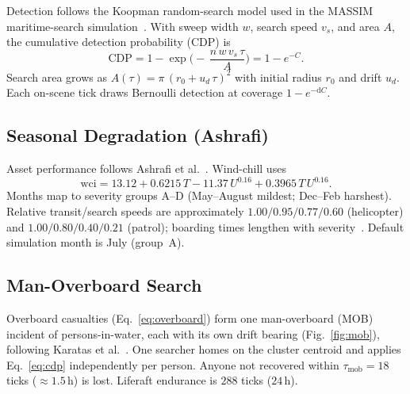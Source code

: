 \documentclass[cameraready]{Interspeech}
\begin{document}
Detection follows the Koopman random-search model used in the MASSIM maritime-search simulation~\cite{karatas2018,koopman1980}. With sweep width $w$, search speed $v_s$, and area $A$, the cumulative detection probability (CDP) is
\begin{equation}
  \text{CDP} = 1 - \exp\Big(-\,\frac{n\,w\,v_s\,\tau}{A}\Big) = 1 - e^{-C}.
  \label{eq:cdp}
\end{equation}
Search area grows as $A(\tau) = \pi\,(r_0 + u_d\,\tau)^2$ with initial radius $r_0$ and drift $u_d$. Each on-scene tick draws Bernoulli detection at coverage $1 - e^{-\mathrm{d}C}$.

\subsection{Seasonal Degradation (Ashrafi)}
\label{sec:sar-ashrafi}

Asset performance follows Ashrafi et al.~\cite{ashrafi2024}. Wind-chill uses
\begin{equation*}
  \text{wci} = 13.12 + 0.6215\,T - 11.37\,U^{0.16} + 0.3965\,T\,U^{0.16}.
\end{equation*}
Months map to severity groups A--D (May--August mildest; Dec--Feb harshest). Relative transit/search speeds are approximately $1.00/0.95/0.77/0.60$ (helicopter) and $1.00/0.80/0.40/0.21$ (patrol); boarding times lengthen with severity~\cite{ashrafi2024}. Default simulation month is July (group~A).

\subsection{Man-Overboard Search}
\label{sec:mob}

Overboard casualties (Eq.~\ref{eq:overboard}) form one man-overboard (MOB) incident of persons-in-water, each with its own drift bearing (Fig.~\ref{fig:mob}), following Karatas et al.~\cite{karatas2018}. One searcher homes on the cluster centroid and applies Eq.~\ref{eq:cdp} independently per person. Anyone not recovered within $\tau_{\text{mob}} = 18$ ticks (${\approx}1.5$\,h) is lost. Liferaft endurance is $288$ ticks ($24$\,h).
\end{document}
